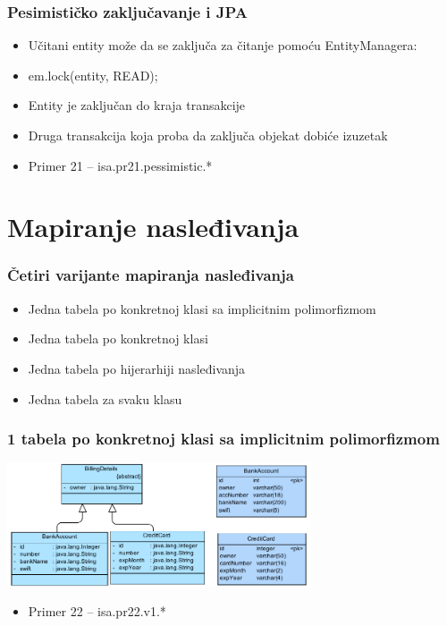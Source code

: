 \documentclass[compress]{beamer}
\begin{document}
\begin{frame}
  \frametitle{Pesimističko zaključavanje i JPA}
  \begin{itemize}
    \item Učitani entity može da se zaključa za čitanje pomoću EntityManagera:
    \item em.lock(entity, READ);
    \item Entity je zaključan do kraja transakcije
    \item Druga transakcija koja proba da zaključa objekat dobiće izuzetak
    \item Primer 21 -- isa.pr21.pessimistic.*
  \end{itemize}
\end{frame}

\section[Nasleđivanje]{Mapiranje nasleđivanja}
\begin{frame}
  \frametitle{Četiri varijante mapiranja nasleđivanja}
  \begin{itemize}
    \item Jedna tabela po konkretnoj klasi sa implicitnim polimorfizmom
    \item Jedna tabela po konkretnoj klasi
    \item Jedna tabela po hijerarhiji nasleđivanja
    \item Jedna tabela za svaku klasu
  \end{itemize}
\end{frame}
\begin{frame}
  \frametitle{1 tabela po konkretnoj klasi sa implicitnim polimorfizmom}
  \begin{center}
    \includegraphics[width=9cm]{pic10.pdf}
  \end{center}
  \begin{itemize}
    \item Primer 22 -- isa.pr22.v1.*
  \end{itemize}
\end{frame}
\end{document}
